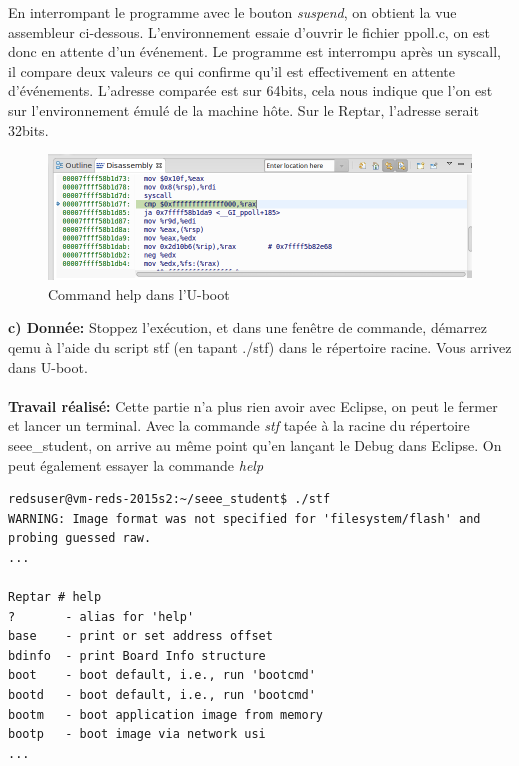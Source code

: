 En interrompant le programme avec le bouton \textit{suspend}, on obtient la vue assembleur ci-dessous. L'environnement essaie d'ouvrir le fichier ppoll.c, on est donc en attente d'un événement. Le programme est interrompu après un syscall, il compare deux valeurs ce qui confirme qu'il est effectivement en attente d'événements. L'adresse comparée est sur 64bits, cela nous indique que l'on est sur l'environnement émulé de la machine hôte. Sur le Reptar, l'adresse serait 32bits.
\begin{figure}[H]
	\begin{center}
		\includegraphics[width=18cm]{img/ubootAsm.png}
		\caption{Command help dans l'U-boot}
		\label{ubootAsm}
	\end{center}
\end{figure}
\textbf{c) Donnée: } Stoppez l'exécution, et dans une fenêtre de commande, démarrez qemu à l'aide du script stf (en
tapant ./stf) dans le répertoire racine. Vous arrivez dans U-boot. \\\\
\textbf{Travail réalisé: }Cette partie n'a plus rien avoir avec Eclipse, on peut le fermer et lancer un terminal.
Avec la commande \textit{stf} tapée à la racine du répertoire seee\_student, on arrive au même point qu'en lançant le Debug dans Eclipse. On peut également essayer la commande \textit{help}
\begin{lstlisting}
redsuser@vm-reds-2015s2:~/seee_student$ ./stf
WARNING: Image format was not specified for 'filesystem/flash' and probing guessed raw.
...

Reptar # help
?       - alias for 'help'
base    - print or set address offset
bdinfo  - print Board Info structure
boot    - boot default, i.e., run 'bootcmd'
bootd   - boot default, i.e., run 'bootcmd'
bootm   - boot application image from memory
bootp   - boot image via network usi
...
\end{lstlisting}
